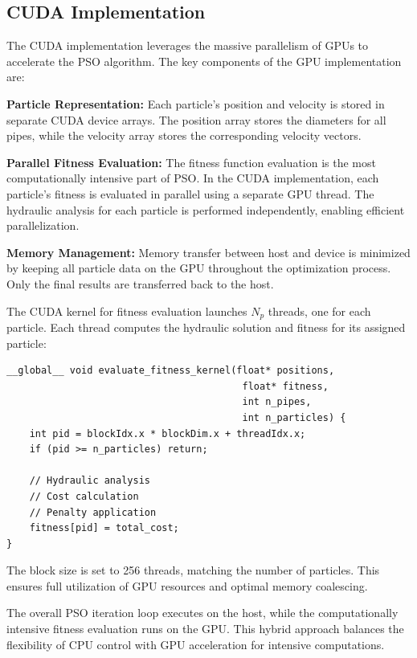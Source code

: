 \documentclass[conference]{IEEEtran}
\begin{document}
\subsection{CUDA Implementation}

The CUDA implementation leverages the massive parallelism of GPUs to accelerate the PSO algorithm. The key components of the GPU implementation are:

\textbf{Particle Representation:} Each particle's position and velocity is stored in separate CUDA device arrays. The position array stores the diameters for all pipes, while the velocity array stores the corresponding velocity vectors.

\textbf{Parallel Fitness Evaluation:} The fitness function evaluation is the most computationally intensive part of PSO. In the CUDA implementation, each particle's fitness is evaluated in parallel using a separate GPU thread. The hydraulic analysis for each particle is performed independently, enabling efficient parallelization.

\textbf{Memory Management:} Memory transfer between host and device is minimized by keeping all particle data on the GPU throughout the optimization process. Only the final results are transferred back to the host.

The CUDA kernel for fitness evaluation launches $N_p$ threads, one for each particle. Each thread computes the hydraulic solution and fitness for its assigned particle:

\begin{verbatim}
__global__ void evaluate_fitness_kernel(float* positions, 
                                         float* fitness,
                                         int n_pipes,
                                         int n_particles) {
    int pid = blockIdx.x * blockDim.x + threadIdx.x;
    if (pid >= n_particles) return;
    
    // Hydraulic analysis
    // Cost calculation
    // Penalty application
    fitness[pid] = total_cost;
}
\end{verbatim}

The block size is set to 256 threads, matching the number of particles. This ensures full utilization of GPU resources and optimal memory coalescing.

The overall PSO iteration loop executes on the host, while the computationally intensive fitness evaluation runs on the GPU. This hybrid approach balances the flexibility of CPU control with GPU acceleration for intensive computations.
\end{document}
